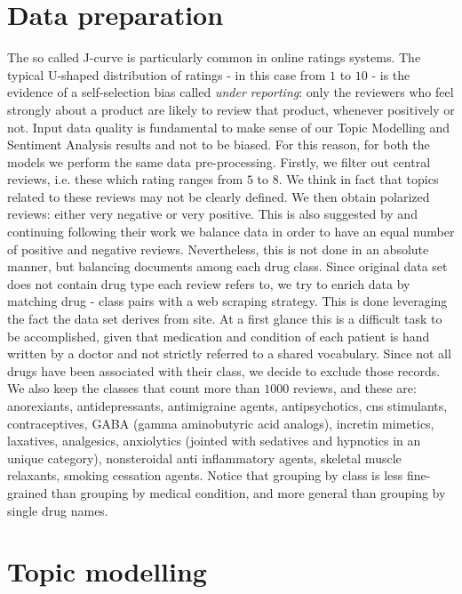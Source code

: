 \documentclass[10pt, a4paper, twocolumn]{article}
\begin{document}
    \section{Data preparation}
        The so called J-curve is particularly common in online ratings systems. The typical U-shaped distribution of ratings - in this case from $1$ to $10$ - is the evidence of a self-selection bias called \emph{under reporting}: only the reviewers who feel strongly about a product are likely to review that product, whenever positively or not. Input data quality is fundamental to make sense of our Topic Modelling and Sentiment Analysis results and not to be biased. For this reason, for both the models we perform the same data pre-processing. Firstly, we filter out central reviews, i.e. these which rating ranges from $5$ to $8$. We think in fact that topics related to these reviews may not be clearly defined. We then obtain polarized reviews: either very negative or very positive. This is also suggested by \cite{drug} and continuing following their work we balance data in order to have an equal number of positive and negative reviews. Nevertheless, this is not done in an absolute manner, but balancing documents among each drug class. Since original data set does not contain drug type each review refers to, we try to enrich data by matching drug - class pairs with a web scraping strategy. This is done leveraging the fact the data set derives from \cite{drugs.com} site. At a first glance this is a difficult task to be accomplished, given that medication and condition of each patient is hand written by a doctor and not strictly referred to a shared vocabulary. Since not all drugs have been associated with their class, we decide to exclude those records. We also keep the classes that count more than $1000$ reviews, and these are: anorexiants, antidepressants, antimigraine agents, antipsychotics, cns stimulants, contraceptives, GABA (gamma aminobutyric acid analogs), incretin mimetics, laxatives, analgesics, anxiolytics (jointed with sedatives and hypnotics in an unique category), nonsteroidal anti inflammatory agents, skeletal muscle relaxants, smoking cessation agents. Notice that grouping by class is less fine-grained than grouping by medical condition, and more general than grouping by single drug names.
        
    \section{Topic modelling}
\end{document}
